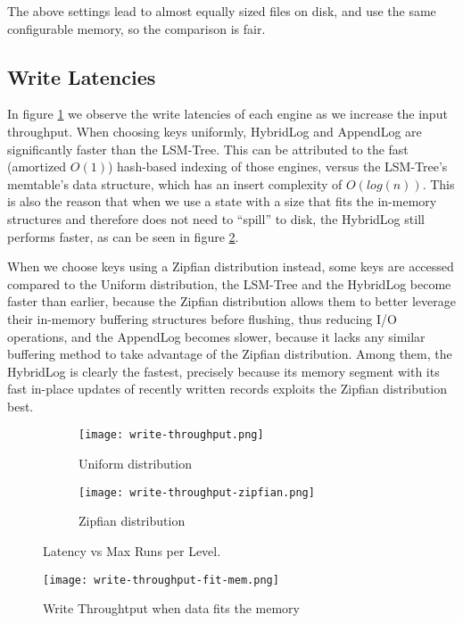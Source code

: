 The above settings lead to almost equally sized files on disk, and use the same configurable memory, so the comparison is fair.

\subsection{Write Latencies}

In figure \ref{fig:comparison-write} we observe the write latencies of each engine as we increase the input throughput. When choosing keys uniformly, HybridLog and AppendLog are significantly faster than the LSM-Tree. This can be attributed to the fast (amortized $O(1)$) hash-based indexing of those engines, versus the LSM-Tree's memtable's data structure, which has an insert complexity of $O(log(n))$. This is also the reason that when we use a state with a size that fits the in-memory structures and therefore does not need to ``spill'' to disk, the HybridLog still performs faster, as can be seen in figure \ref{fig:comparison-write-fit-mem}.

When we choose keys using a Zipfian distribution instead, some keys are accessed compared to the Uniform distribution, the LSM-Tree and the HybridLog become faster than earlier, because the Zipfian distribution allows them to better leverage their in-memory buffering structures before flushing, thus reducing I/O operations, and the AppendLog becomes slower, because it lacks any similar buffering method to take advantage of the Zipfian distribution. Among them, the HybridLog is clearly the fastest, precisely because its memory segment with its fast in-place updates of recently written records exploits the Zipfian distribution best.


\begin{figure}[h]
    \begin{subfigure}{.5\textwidth}
        \centering
        \texttt{[image: write-throughput.png]}
        \caption{Uniform distribution}
    \end{subfigure}
    \begin{subfigure}{.5\textwidth}
        \centering
        \texttt{[image: write-throughput-zipfian.png]}
        \caption{Zipfian distribution}
    \end{subfigure}
    \caption{Latency vs Max Runs per Level.}
    \label{fig:comparison-write}
\end{figure}

\begin{figure}[h]
    \centering
    \texttt{[image: write-throughput-fit-mem.png]}
    \caption{Write Throughtput when data fits the memory}
    \label{fig:comparison-write-fit-mem}
\end{figure}

